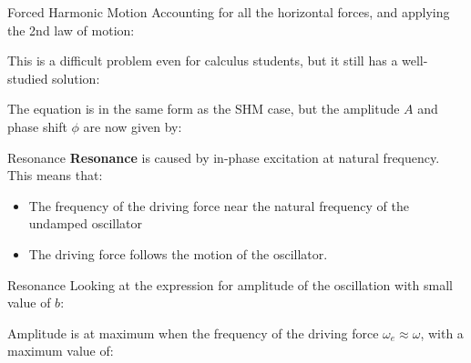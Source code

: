 \documentclass[12pt,compress,aspectratio=169]{beamer}
\begin{document}
\begin{frame}{Forced Harmonic Motion}
  Accounting for all the horizontal forces, and applying the 2nd law of motion:
  

  \vspace{-.1in}This is a difficult problem even for calculus students, but
  it still has a well-studied solution:
  
  
  The equation is in the same form as the SHM case, but the amplitude $A$ and
  phase shift $\phi$ are now given by:
  
\end{frame}



\begin{frame}{Resonance}
  \textbf{Resonance} is caused by in-phase excitation at natural frequency.
  This means that:
  \begin{itemize}
  \item The frequency of the driving force near the natural frequency of
    the undamped oscillator

  \item The driving force follows the motion of the oscillator.
  \end{itemize}
\end{frame}



\begin{frame}{Resonance}
  Looking at the expression for amplitude of the oscillation with small value
  of $b$:
  
  
  Amplitude is at maximum when the frequency of the driving force
  $\omega_e\approx\omega$, with a maximum value of:
  
\end{frame}
\end{document}
